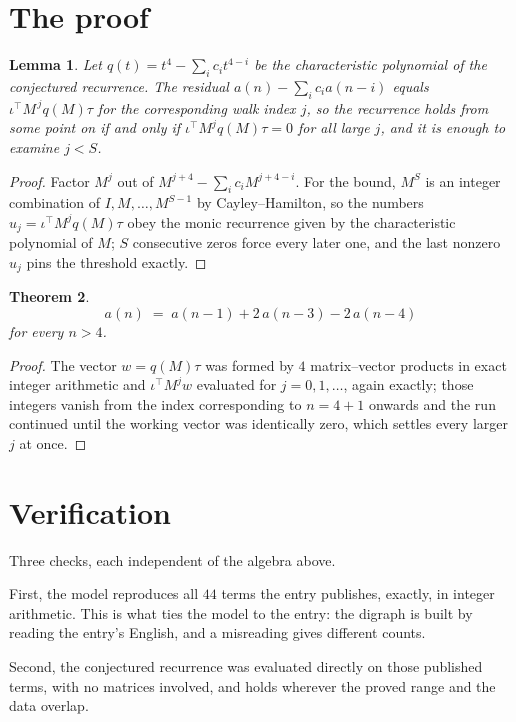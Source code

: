 \documentclass[11pt,a4paper]{article}
\theoremstyle{plain}
\newtheorem{theorem}{Theorem}
\newtheorem{lemma}[theorem]{Lemma}
\theoremstyle{definition}
\begin{document}
\section{The proof}

\begin{lemma}\label{lem:crit}
Let $q(t)=t^{4}-\sum_i c_it^{4-i}$ be the characteristic polynomial of the
conjectured recurrence. The residual $a(n)-\sum_ic_ia(n-i)$ equals
$\iota^{\!\top}M^{\,j}q(M)\tau$ for the corresponding walk index $j$, so the recurrence
holds from some point on if and only if $\iota^{\!\top}M^{j}q(M)\tau=0$ for all large $j$,
and it is enough to examine $j<S$.
\end{lemma}

\begin{proof}
Factor $M^{j}$ out of $M^{j+4}-\sum_ic_iM^{j+4-i}$. For the bound, $M^{S}$
is an integer combination of $I,M,\dots,M^{S-1}$ by Cayley--Hamilton, so the numbers
$u_j=\iota^{\!\top}M^{j}q(M)\tau$ obey the monic recurrence given by the characteristic
polynomial of $M$; $S$ consecutive zeros force every later one, and the last nonzero $u_j$
pins the threshold exactly.
\end{proof}

\begin{theorem}
\[
a(n)\;=\;a(n-1) + 2\,a(n-3) - 2\,a(n-4)
\]
for every $n>4$.
\end{theorem}

\begin{proof}
The vector $w=q(M)\tau$ was formed by $4$ matrix--vector products in exact integer
arithmetic and $\iota^{\!\top}M^{j}w$ evaluated for $j=0,1,\dots$, again exactly; those
integers vanish from the index corresponding to $n=4+1$ onwards and the run continued
until the working vector was identically zero, which settles every larger $j$ at once.
\end{proof}

\section{Verification}

Three checks, each independent of the algebra above.

First, the model reproduces all $44$ terms the entry publishes, exactly, in integer
arithmetic. This is what ties the model to the entry: the digraph is built by reading the
entry's English, and a misreading gives different counts.

Second, the conjectured recurrence was evaluated directly on those published terms, with no
matrices involved, and holds wherever the proved range and the data overlap.
\end{document}
